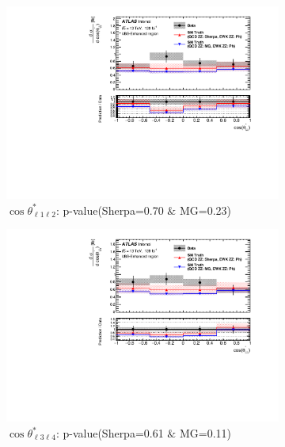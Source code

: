 \begin{figure}[!htb]
    \centering
    \begin{subfigure}{.49\textwidth}
        \centering
        \includegraphics[width=.98\linewidth]{figures/Results/CrossSection_VBSEnhanced/xs_cosThetaStar1_SR.pdf}
        \caption{ \footnotesize{$\cos \theta^{*}_{\ell 1 \ell 2}$: p-value(Sherpa=0.70 $\&$ MG=0.23)}}
    \end{subfigure}
    \begin{subfigure}{.49\textwidth}
        \centering
        \includegraphics[width=.98\linewidth]{figures/Results/CrossSection_VBSEnhanced/xs_cosThetaStar3_SR.pdf}
        \caption{ \footnotesize{$\cos \theta^{*}_{\ell 3 \ell 4}$: p-value(Sherpa=0.61 $\&$ MG=0.11)} }
    \end{subfigure}\\
    \begin{subfigure}{.49\textwidth}

\end{subfigure}
\end{figure}
